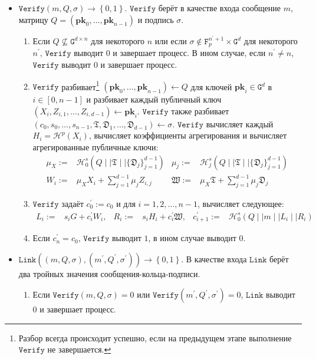 \documentclass{llncs}
\newcommand{\F}{\texttt{F}_p}
\newcommand{\G}{\texttt{G}}
\newcommand{\Hp}{\mathcal{H}^p}
\newcommand{\Hs}{\mathcal{H}^s}
\begin{document}
\begin{definition}[$d$-CLSAG]
\begin{itemize}
\item $\texttt{Verify}\left(m, Q, \sigma\right) \to \left\{0,1\right\}$. $\texttt{Verify}$ берёт в качестве входа сообщение $m$, матрицу $Q = (\textbf{pk}_0, \ldots, \textbf{pk}_{n-1})$ и подпись $\sigma$.
\begin{enumerate}
\item Если $Q \not\subseteq \G^{d \times n}$ для некоторого $n$ или если $\sigma \notin \F^{n^\prime+1} \times \G^d$ для некоторого $n^\prime$, $\texttt{Verify}$ выводит $0$ и завершает процесс. В ином случае, если $n^\prime \neq n$, $\texttt{Verify}$ выводит $0$ и завершает процесс.

\item $\texttt{Verify}$ разбивает\footnote{Разбор всегда происходит успешно, если на предыдущем этапе выполнение $\texttt{Verify}$ не завершается.} $(\textbf{pk}_0, \ldots, \textbf{pk}_{n-1}) \leftarrow Q$ для ключей $\textbf{pk}_i \in \G^d$ в $i \in [0,n-1]$ и разбивает каждый публичный ключ $(X_i, Z_{i, 1}, \ldots, Z_{i, d-1}) \leftarrow \textbf{pk}_i$.  $\texttt{Verify}$ также разбивает $(c_0, s_0, \ldots, s_{n-1}, \mathfrak{T}, \mathfrak{D}_1, \ldots, \mathfrak{D}_{d - 1}) \leftarrow \sigma$. $\texttt{Verify}$ вычисляет каждый $H_i = \Hp(X_i)$, вычисляет коэффициенты агрегирования и вычисляет агрегированные публичные ключи:
\begin{align*}
\mu_X := & \Hs_0(Q \mid \mid \mathfrak{T} \mid \mid \{\mathfrak{D}_j\}_{j=1}^{d-1}) & \mu_j := & \Hs_j(Q \mid \mid \mathfrak{T} \mid \mid \{\mathfrak{D}_j\}_{j=1}^{d-1})\\
W_i :=& \mu_X X_i + \sum_{j=1}^{d-1} \mu_j Z_{i,j} & \mathfrak{W} :=& \mu_X \mathfrak{T} + \sum_{j=1}^{d-1} \mu_j \mathfrak{D}_j
\end{align*}

\item $\texttt{Verify}$ задаёт $c_0^\prime := c_0$ и для $i=1, 2, \ldots, n-1$, вычисляет следующее:
\begin{align*}
L_i :=& s_i G + c_i^\prime W_i, &
R_i :=& s_i H_i + c_i^\prime\mathfrak{W}, &
c_{i+1}^\prime :=& \Hs_0\left(Q \mid \mid m \mid \mid L_i \mid \mid R_i\right)
\end{align*}
\item Если $c_{n}^\prime = c_0$, $\texttt{Verify}$ выводит $1$, в ином случае выводит $0$.
\end{enumerate}

\item $\texttt{Link}\left((m, Q, \sigma), (m^\prime, Q^\prime, \sigma^\prime)\right) \to \left\{0,1\right\}$. В качестве входа $\texttt{Link}$ берёт два тройных значения сообщения-кольца-подписи.
\begin{enumerate}
\item Если $\texttt{Verify}(m, Q, \sigma) = 0$ или $\texttt{Verify}(m^\prime, Q^\prime, \sigma^\prime) = 0$, $\texttt{Link}$ выводит $0$ и завершает процесс.


\end{enumerate}
\end{itemize}
\end{definition}
\end{document}
